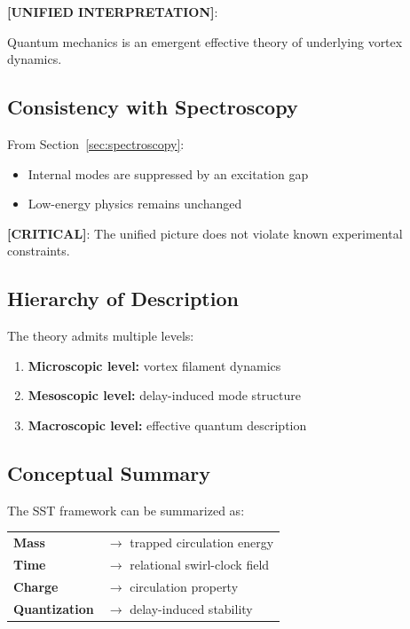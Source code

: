         \textbf{[UNIFIED INTERPRETATION]}:
        \begin{center}
            Quantum mechanics is an emergent effective theory of underlying vortex dynamics.
        \end{center}
    
    \subsection{Consistency with Spectroscopy}
        
        From Section~\ref{sec:spectroscopy}:
        
        \begin{itemize}
            \item Internal modes are suppressed by an excitation gap
            \item Low-energy physics remains unchanged
        \end{itemize}
        
        \textbf{[CRITICAL]}:
        The unified picture does not violate known experimental constraints.
    
    \subsection{Hierarchy of Description}
        
        The theory admits multiple levels:
        
        \begin{enumerate}
            \item \textbf{Microscopic level:} vortex filament dynamics
            \item \textbf{Mesoscopic level:} delay-induced mode structure
            \item \textbf{Macroscopic level:} effective quantum description
        \end{enumerate}
    
    \subsection{Conceptual Summary}
        
        The SST framework can be summarized as:
        
        \begin{center}
            \begin{tabular}{ll}
                \textbf{Mass} & $\rightarrow$ trapped circulation energy \\
                \textbf{Time} & $\rightarrow$ relational swirl-clock field \\
                \textbf{Charge} & $\rightarrow$ circulation property \\
                \textbf{Quantization} & $\rightarrow$ delay-induced stability \\
            \end{tabular}
        \end{center}
    
